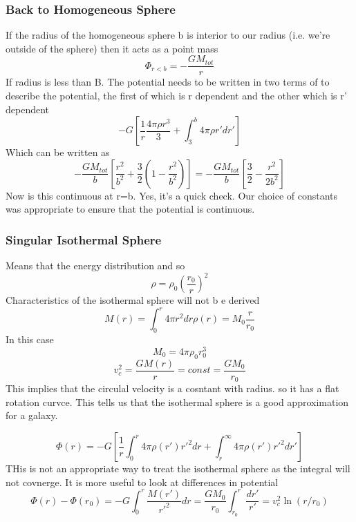 \subsubsection{Back to Homogeneous Sphere}
If the radius of the homogeneous sphere b is interior to our radius
(i.e. we're outside of the sphere) then it acts as a point mass
\begin{equation}
\Phi_{r <b} = -\frac{GM_{tot}}{r}
\end{equation}
If radius is less than B. The potential needs to be written in two terms
of to describe the potential, the first of which is r dependent and
the other which is r' dependent
\begin{equation}
- G \left[ \frac{1}{r} \frac{4\pi\rho r^3}{3} + \int^b_3 4\pi\rho r'dr'\right]
\end{equation}
Which can be written as 
\begin{equation}
-\frac{GM_{tot}}{b} \left[ \frac{r^2}{b^2} + \frac{3}{2} ( 1 -
  \frac{r^2}{b^2})\right] = - \frac{GM_{tot}}{b} \left[ \frac{3}{2} -
  \frac{r^2}{2b^2}\right]
\end{equation}
Now is this continuous at r=b. Yes, it's a quick check. Our choice of
constants was appropriate to ensure that the potential is
continuous. 

\subsubsection{Singular Isothermal Sphere}
Means that the energy distribution and so
\begin{equation}
\rho = \rho_0 \left(\frac{r_0}{r}\right)^2
\end{equation}
Characteristics of the isothermal sphere will not b e derived
\begin{equation}
M(r) = \int_0^r 4\pi r^2 dr \rho(r) = M_0 \frac{r}{r_0}
\end{equation}
In this case
\begin{equation}
M_0 = 4\pi \rho_0 r_0^3
\end{equation}
\begin{equation}
v_c^2 = \frac{GM(r)}{r} = const = \frac{GM_0}{r_0}
\end{equation}
This implies that the circulal velocity is a cosntant with radius. so it has a flat rotation curvce. This tells us that the isothermal sphere is a good approximation for a galaxy.

\begin{equation}
\Phi(r) = -G[\frac{1}{r} \int_0^r 4\pi \rho(r') r'^2 dr + \int^\infty_r 4\pi \rho(r') r'^2 dr']
\end{equation}
THis is not an appropriate way to treat the isothermal sphere as the integral will not covnerge. It is more useful to look at differences in potential
\begin{equation}
\Phi(r) - \Phi(r_0) = -G\int_0^r \frac{M(r')}{r'^2} dr = \frac{GM_0}{r_0} \int_{r_0}^r \frac{dr'}{r'} = v_c^2 \ln(r/r_0)
\end{equation}


